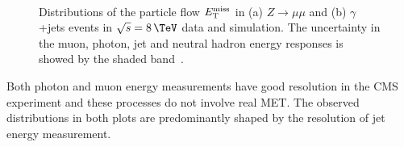 \begin{figure}[!htp]%
\centering
{}\qquad
{}\\
 \caption[Distributions of the particle flow $\MET$ in $Z\rightarrow\mu\mu$ and $\gamma$+jets events in $\sqrt{s}=8\,\TeV$ data and simulation.]{Distributions of the particle flow $\MET$ in (a) $Z\rightarrow\mu\mu$ and (b) $\gamma$+jets events in $\sqrt{s}=8\,\TeV$ data and simulation. The uncertainty in the muon, photon, jet and neutral hadron energy responses is showed by the shaded band~\cite{ARTICLE:CMSMETPerformance8TeV}.}
\label{FIGURE:EventReconstructionAndSimulation_METDistributionZmumu}
\end{figure}

Both photon and muon energy measurements have good resolution in the \gls{CMS} experiment and these processes do not involve real \gls{MET}. The observed distributions in both plots are predominantly shaped by the resolution of jet energy measurement.

